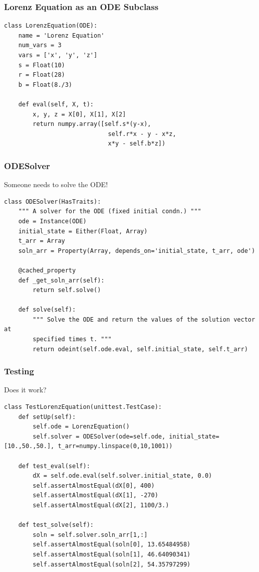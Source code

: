\documentclass[14pt,compress]{beamer}
\newcounter{time}
\begin{document}
\begin{frame}
\frametitle{Lorenz Equation as an ODE Subclass}
\scriptsize
\begin{lstlisting}
class LorenzEquation(ODE):
    name = 'Lorenz Equation'
    num_vars = 3
    vars = ['x', 'y', 'z']
    s = Float(10)
    r = Float(28)
    b = Float(8./3)

    def eval(self, X, t):
        x, y, z = X[0], X[1], X[2]
        return numpy.array([self.s*(y-x),
                             self.r*x - y - x*z,
                             x*y - self.b*z])
\end{lstlisting}
\end{frame}


\begin{frame}
\frametitle{ODESolver}
Someone needs to solve the ODE!
\scriptsize
\begin{lstlisting}
class ODESolver(HasTraits):
    """ A solver for the ODE (fixed initial condn.) """
    ode = Instance(ODE)
    initial_state = Either(Float, Array)
    t_arr = Array
    soln_arr = Property(Array, depends_on='initial_state, t_arr, ode')

    @cached_property
    def _get_soln_arr(self):
        return self.solve()

    def solve(self):
        """ Solve the ODE and return the values of the solution vector at
        specified times t. """
        return odeint(self.ode.eval, self.initial_state, self.t_arr)
\end{lstlisting}
\end{frame}

\begin{frame}
\frametitle{Testing}
Does it work?
\scriptsize
\begin{lstlisting}
class TestLorenzEquation(unittest.TestCase):
    def setUp(self):
        self.ode = LorenzEquation()
        self.solver = ODESolver(ode=self.ode, initial_state=[10.,50.,50.], t_arr=numpy.linspace(0,10,1001))

    def test_eval(self):
        dX = self.ode.eval(self.solver.initial_state, 0.0)
        self.assertAlmostEqual(dX[0], 400)
        self.assertAlmostEqual(dX[1], -270)
        self.assertAlmostEqual(dX[2], 1100/3.)

    def test_solve(self):
        soln = self.solver.soln_arr[1,:]
        self.assertAlmostEqual(soln[0], 13.65484958)
        self.assertAlmostEqual(soln[1], 46.64090341)
        self.assertAlmostEqual(soln[2], 54.35797299)
\end{lstlisting}
\end{frame}
\end{document}
